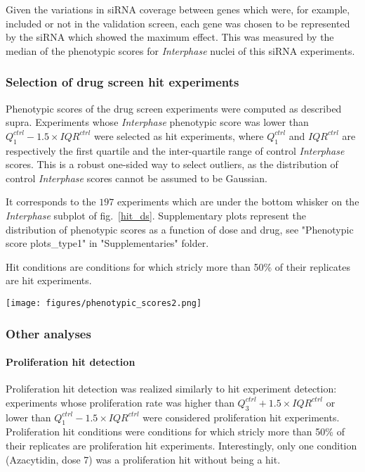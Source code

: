 Given the variations in siRNA coverage between genes which were, for example, included or not in the validation screen, each gene was chosen to be represented by the siRNA which showed the maximum effect. This was measured by the median of the phenotypic scores for \textit{Interphase} nuclei of this siRNA experiments.


\subsubsection{Selection of drug screen hit experiments}
\label{sec:selection_ds}
Phenotypic scores of the drug screen experiments were computed as described supra. Experiments whose \textit{Interphase} phenotypic score was lower than $Q_1^{ctrl} - 1.5\times IQR^{ctrl}$ were selected as hit experiments, where $Q_1^{ctrl}$ and $IQR^{ctrl}$ are respectively the first quartile and the inter-quartile range of control \textit{Interphase} scores. This is a robust one-sided way to select outliers, as the distribution of control \textit{Interphase} scores cannot be assumed to be Gaussian. 

It corresponds to the $197$ experiments which are under the bottom whisker on the \textit{Interphase} subplot of fig.~\ref{hit_ds}. Supplementary plots represent the distribution of phenotypic scores as a function of dose and drug, see "Phenotypic score plots\_type1" in "Supplementaries" folder.

Hit conditions are conditions for which stricly more than 50\% of their replicates are hit experiments.

\begin{figure*}[ht!]
\centerline{\texttt{[image: figures/phenotypic\_scores2.png]}
}
\caption{Distributions of phenotypic scores from the drug screen experiments. Each boxplot corresponds to the distribution of control phenotypic scores, whereas each red dot is an experiment in which cells were exposed to a drug.}
\label{hit_ds}
\end{figure*}

\subsubsection{Other analyses}
\paragraph{Proliferation hit detection}
Proliferation hit detection was realized similarly to hit experiment detection: experiments whose proliferation rate was higher than $Q_3^{ctrl} + 1.5\times IQR^{ctrl}$ or lower than $Q_1^{ctrl} - 1.5\times IQR^{ctrl}$ were considered proliferation hit experiments. Proliferation hit conditions were conditions for which stricly more than 50\% of their replicates are proliferation hit experiments. Interestingly, only one condition (Azacytidin, dose 7) was a proliferation hit without being a hit.
